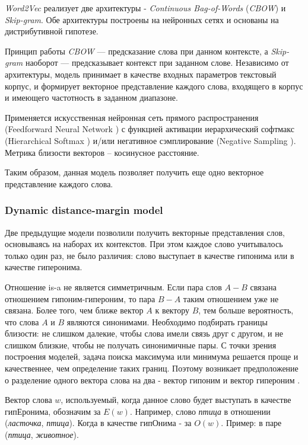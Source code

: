 \textit{Word2Vec} реализует две архитектуры - \textit{Continuous Bag-of-Words} (\textit{CBOW}) и \textit{Skip-gram}. Обе архитектуры построены на нейронных сетях и основаны на дистрибутивной гипотезе.

Принцип работы \textit{CBOW} — предсказание слова при данном контексте, а \textit{Skip-gram}
наоборот — предсказывает контекст при заданном слове. Независимо от архитектуры,
модель принимает в качестве входных параметров текстовый корпус, и формирует
векторное представление каждого слова, входящего в корпус и имеющего частотность в
заданном диапазоне.

Применяется искусственная нейронная сеть прямого распространения (Feedforward Neural
Network \cite{Feedforward}) с функцией активации иерархический софтмакс (Hierarchical Softmax \cite{SoftMax}) и/или
негативное сэмплирование (Negative Sampling \cite{NegSamp}). Метрика близости векторов – косинусное
расстояние.

Таким образом, данная модель позволяет получить еще одно векторное представление
каждого слова.

\subsubsection{Dynamic distance-margin model}

Две предыдущие модели позволили получить векторные представления слов,
основываясь на наборах их контекстов. При этом каждое слово учитывалось
только один раз, не было различия: слово выступает в качестве гипонима или в
качестве гиперонима.

Отношение is-a не является симметричным. Если пара слов $A-B$ связана
отношением гипоним-гипероним, то пара $B-A$ таким отношением уже не связана.
Более того, чем ближе вектор ${A}$ к вектору ${B}$, тем больше вероятность, что слова ${A}$ и ${B}$ являются синонимами. Необходимо подбирать границы близости: не слишком
далекие, чтобы слова имели связь друг с другом, и не слишком близкие, чтобы не
получать синонимичные пары. С точки зрения построения моделей, задача поиска
максимума или минимума решается проще и качественнее, чем определение таких
границ. Поэтому возникает предположение о разделение одного вектора слова на
два - вектор гипоним и вектор гипероним \cite{DDM}.

Вектор слова \textbf{$w$}, используемый, когда данное слово будет выступать в качестве
гипЕронима, обозначим за \textbf{$E(w)$}. Например, слово \textit{птица} в отношении (\textit{ласточка}, \textit{птица}). Когда в качестве гипОнима - за \textbf{$O(w)$}. Пример: в паре (\textit{птица}, \textit{животное}).

